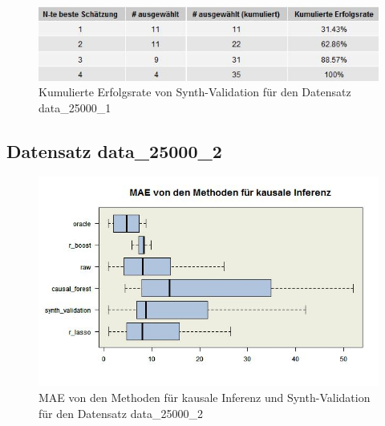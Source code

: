 \documentclass[12pt,a4paper,twoside]{scrartcl}
\numberwithin{equation}{section}
\newcounter{mypagecount}%
\newenvironment{interlude}{%
  \clearpage
  \setcounter{mypagecount}{\value{page}}%
  \thispagestyle{empty}%
  \pagestyle{empty}%
}{%
  \clearpage
  \setcounter{page}{\value{mypagecount}}%
}
\begin{document}
\begin{interlude}
\begin{appendices}
\begin{center}
\begin{figure}[H]
    \centering
    \includegraphics[height=0.2\textwidth, width=1\textwidth]{figures/plots/appendix/rawData25000aGrid.jpeg}
    \vspace{1mm}
    \caption[Kumulierte Erfolgsrate von Synth-Validation für den Datensatz data\_25000\_1]{Kumulierte Erfolgsrate von Synth-Validation für den Datensatz data\_25000\_1}
  \end{figure}
\end{center}

\subsection{Datensatz data\_25000\_2}

\begin{center}
\begin{figure}[H]
    \centering
    \includegraphics[height=0.5\textwidth, width=1\textwidth]{figures/plots/appendix/rawData25000bBoxplot.jpeg}
    \caption[MAE von den Methoden für kausale Inferenz und Synth-Validation für den Datensatz data\_25000\_2]{MAE von den Methoden für kausale Inferenz und Synth-Validation für den Datensatz data\_25000\_2}
  \end{figure}
\end{center}


\end{appendices}
\end{interlude}
\end{document}
